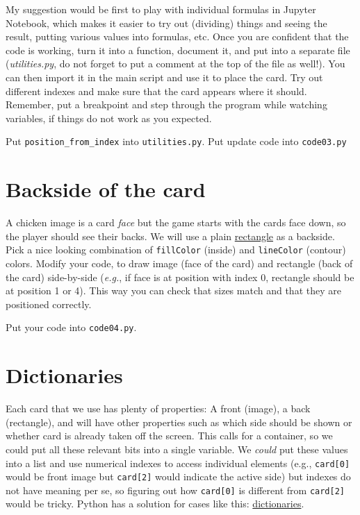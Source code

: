 \documentclass[
]{book}
\begin{document}
My suggestion would be first to play with individual formulas in Jupyter Notebook, which makes it easier to try out (dividing) things and seeing the result, putting various values into formulas, etc. Once you are confident that the code is working, turn it into a function, document it, and put into a separate file (\emph{utilities.py}, do not forget to put a comment at the top of the file as well!). You can then import it in the main script and use it to place the card. Try out different indexes and make sure that the card appears where it should. Remember, put a breakpoint and step through the program while watching variables, if things do not work as you expected.

Put \texttt{position\_from\_index} into \texttt{utilities.py}.
Put update code into \texttt{code03.py}

\hypertarget{backside-of-the-card}{%
\section{Backside of the card}\label{backside-of-the-card}}

A chicken image is a card \emph{face} but the game starts with the cards face down, so the player should see their backs. We will use a plain \href{https://psychopy.org/api/visual/rect.html}{rectangle} as a backside. Pick a nice looking combination of \texttt{fillColor} (inside) and \texttt{lineColor} (contour) colors. Modify your code, to draw image (face of the card) and rectangle (back of the card) side-by-side (\emph{e.g.}, if face is at position with index 0, rectangle should be at position 1 or 4). This way you can check that sizes match and that they are positioned correctly.

Put your code into \texttt{code04.py}.

\hypertarget{dictionaries}{%
\section{Dictionaries}\label{dictionaries}}

Each card that we use has plenty of properties: A front (image), a back (rectangle), and will have other properties such as which side should be shown or whether card is already taken off the screen. This calls for a container, so we could put all these relevant bits into a single variable. We \emph{could} put these values into a list and use numerical indexes to access individual elements (e.g., \texttt{card{[}0{]}} would be front image but \texttt{card{[}2{]}} would indicate the active side) but indexes do not have meaning per se, so figuring out how \texttt{card{[}0{]}} is different from \texttt{card{[}2{]}} would be tricky. Python has a solution for cases like this: \href{https://docs.python.org/3/library/stdtypes.html\#dict}{dictionaries}.
\end{document}
